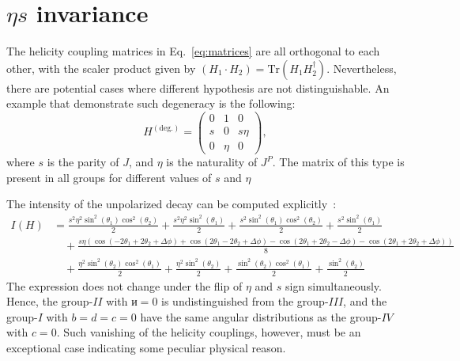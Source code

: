 \documentclass[prd,preprintnumbers,floatfix,
nofootinbib,superscriptaddress]{revtex4}
\newcommand{\I}{\ensuremath{I}}
\newcommand{\II}{\ensuremath{{I\!I}}}
\newcommand{\III}{\ensuremath{{I\!I\!I}}}
\newcommand{\IV}{\ensuremath{{I\!V}}}
\begin{document}
\section{$\eta s$ invariance}
The helicity coupling matrices in Eq.~\eqref{eq:matrices} are all orthogonal to each other,
with the scaler product given by $(H_1\cdot H_2) = \mathrm{Tr}(H_1 H_2^\dagger)$.
Nevertheless, there are potential cases where different hypothesis are not distinguishable.
An example that demonstrate such degeneracy is the following:
\begin{equation}
  H^{(\text{deg.})} = \begin{pmatrix}
    0 &1 &0 \\
    s & 0 &s\eta \\
    0 &\eta &0
  \end{pmatrix},
\end{equation}
where $s$ is the parity of $J$, and $\eta$ is the naturality of $J^P$.
The matrix of this type is present in all groups for different values of $s$ and $\eta$

The intensity of the unpolarized decay can be computed explicitly~\cite{7717/peerj-cs.103}:
\begin{align}
  I(H) &= \frac{s^{2} \eta^{2} \sin^{2}{\left (\theta_{1} \right )} \cos^{2}{\left (\theta_{2} \right )}}{2} + \frac{s^{2} \eta^{2} \sin^{2}{\left (\theta_{1} \right )}}{2} + \frac{s^{2} \sin^{2}{\left (\theta_{1} \right )} \cos^{2}{\left (\theta_{2} \right )}}{2} + \frac{s^{2} \sin^{2}{\left (\theta_{1} \right )}}{2} \\ \nonumber
   &\quad + \frac{s \eta \left(\cos{\left (- 2 \theta_{1} + 2 \theta_{2} + \Delta\phi \right )} + \cos{\left (2 \theta_{1} - 2 \theta_{2} + \Delta\phi \right )} - \cos{\left (2 \theta_{1} + 2 \theta_{2} - \Delta\phi \right )} - \cos{\left (2 \theta_{1} + 2 \theta_{2} + \Delta\phi \right )}\right)}{8}\\ \nonumber
   &\quad+\frac{\eta^{2} \sin^{2}{\left (\theta_{2} \right )} \cos^{2}{\left (\theta_{1} \right )}}{2} + \frac{\eta^{2} \sin^{2}{\left (\theta_{2} \right )}}{2} + \frac{\sin^{2}{\left (\theta_{2} \right )} \cos^{2}{\left (\theta_{1} \right )}}{2} + \frac{\sin^{2}{\left (\theta_{2} \right )}}{2}
\end{align}
The expression does not change under the flip of $\eta$ and $s$ sign simultaneously.
Hence, the group-$\II$ with $и=0$ is undistinguished from the group-$\III$,
and the group-$\I$ with $b=d=c=0$ have the same angular distributions as the group-$\IV$ with $c=0$.
Such vanishing of the helicity couplings, however, must be an exceptional case indicating some peculiar physical reason.


\end{document}
